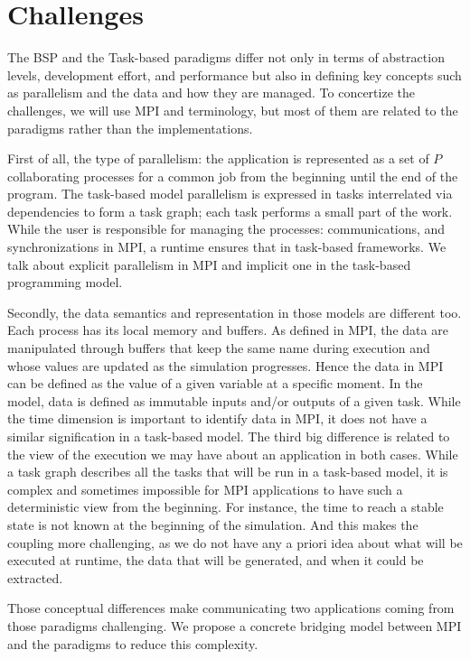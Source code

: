 \section{Challenges}\label{sec:challanges}

The BSP and the Task-based paradigms differ not only in terms of abstraction levels, development effort, and performance but also in defining key concepts such as parallelism and the data and how they are managed. To concertize the challenges, we will use MPI and \dask terminology, but most of them are related to the paradigms rather than the implementations. 

First of all, the type of parallelism: the application is represented as a set of $P$ collaborating processes for a common job from the beginning until the end of the program. 
The task-based model parallelism is expressed in tasks interrelated via dependencies to form a task graph; each task performs a small part of the work. While the user is responsible for managing the processes: communications, and synchronizations in MPI, a runtime ensures that in task-based frameworks. 
We talk about explicit parallelism in MPI and implicit one in the task-based programming model. 

Secondly, the data semantics and representation in those models are different too. Each process has its local memory and buffers. As defined in MPI, the data are manipulated through buffers that keep the same name during execution and whose values are updated as the simulation progresses. Hence the data in MPI can be defined as the value of a given variable at a specific moment.
In the \dask model, data is defined as immutable inputs and/or outputs of a given task. While the time dimension is important to identify data in MPI, it does not have a similar signification in a task-based model. 
The third big difference is related to the view of the execution we may have about an application in both cases. While a task graph describes all the tasks that will be run in a task-based model, it is complex and sometimes impossible for MPI applications to have such a deterministic view from the beginning. For instance, the time to reach a stable state is not known at the beginning of the simulation. And this makes the coupling more challenging, as we do not have any a priori idea about what will be executed at runtime, the data that will be generated, and when it could be extracted.

Those conceptual differences make communicating two applications coming from those paradigms challenging. We propose a concrete bridging model between MPI and the \dask paradigms to reduce this complexity.


